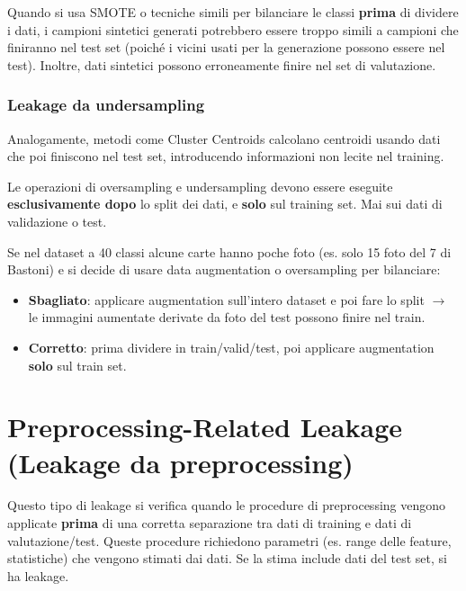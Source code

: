 \documentclass[a4paper,12pt]{article}
\begin{document}
Quando si usa SMOTE o tecniche simili per bilanciare le classi \textbf{prima} di dividere i dati, i campioni sintetici generati potrebbero essere troppo simili a campioni che finiranno nel test set (poiché i vicini usati per la generazione possono essere nel test). Inoltre, dati sintetici possono erroneamente finire nel set di valutazione.

\subsubsection{Leakage da undersampling}

Analogamente, metodi come Cluster Centroids calcolano centroidi usando dati che poi finiscono nel test set, introducendo informazioni non lecite nel training.

\begin{attenzione}
Le operazioni di oversampling e undersampling devono essere eseguite \textbf{esclusivamente dopo} lo split dei dati, e \textbf{solo} sul training set. Mai sui dati di validazione o test.
\end{attenzione}

\begin{esempio}
Se nel dataset a 40 classi alcune carte hanno poche foto (es. solo 15 foto del 7 di Bastoni) e si decide di usare data augmentation o oversampling per bilanciare:
\begin{itemize}[noitemsep]
    \item \textbf{Sbagliato}: applicare augmentation sull'intero dataset e poi fare lo split $\rightarrow$ le immagini aumentate derivate da foto del test possono finire nel train.
    \item \textbf{Corretto}: prima dividere in train/valid/test, poi applicare augmentation \textbf{solo} sul train set.
\end{itemize}
\end{esempio}

\section{Preprocessing-Related Leakage (Leakage da preprocessing)}

Questo tipo di leakage si verifica quando le procedure di preprocessing vengono applicate \textbf{prima} di una corretta separazione tra dati di training e dati di valutazione/test. Queste procedure richiedono parametri (es. range delle feature, statistiche) che vengono stimati dai dati. Se la stima include dati del test set, si ha leakage.
\end{document}
